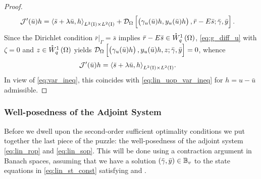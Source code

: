 \documentclass[final]{siamltex}
\begin{document}
\begin{proof}
\begin{align*}
	\mathcal{J}'({\bar{u}}) h	
    		&= {{\mathop{{\left\langle {{{\bar{s}} + \lambda {\bar{u}}, h}} \right\rangle}}}_{{{L^2\del{{{\text{\rm I}}}}}}\times{{L^2\del{{{\text{\rm I}}}}}}}}
			+ {{\mathcal{D}}_\Omega}\sbr{\del{\gamma_u({\bar{u}})h, y_u({\bar{u}})h},{\bar{r}} - E {\bar{s}};{\bar{\gamma}}, {\bar{y}}}.
\end{align*}
Since the Dirichlet 
condition ${\bar{r}}{\vert}_\Gamma = {\bar{s}}$ implies ${\bar{r}} - E {\bar{s}} \in {{\mathring{W}^{{1}}_{{q}}\del{{\Omega}}}}$,
\eqref{eq:g_diff_u}  with $\zeta = 0$ and $z \in {{\mathring{W}^{1}_{q}\del{\Omega}}}$ yields 
${{\mathcal{D}}_\Omega}\sbr{\del{\gamma_u({\bar{u}})h}, y_u({\bar{u}})h, z; {\bar{\gamma}}, {\bar{y}}} = 0$, whence
\begin{align*}	
     \mathcal{J}'({\bar{u}}) h				 
        		&= {{\mathop{{\left\langle {{{\bar{s}} + \lambda {\bar{u}}, h}} \right\rangle}}}_{{{L^2\del{{{\text{\rm I}}}}}}\times{{L^2\del{{{\text{\rm I}}}}}}}}.
\end{align*}
In view of \eqref{eq:var_ineq}, this coincides with \eqref{eq:lin_uop_var_ineq} for $h = u - {\bar{u}}$ admissible. 
\end{proof}

\subsubsection{Well-posedness of the Adjoint System}
\label{s:oc_rc_adjoint}
Before we dwell upon the second-order sufficient optimality conditions we put together the last 
piece of the puzzle: the well-posedness of the adjoint system 
\eqref{eq:lin_rop} and \eqref{eq:lin_sop}. This will be done using a contraction argument in 
Banach spaces, assuming that we have a solution $\del{{\bar{\gamma}},{\bar{y}}} \in {\mathbb{B}}_v$ 
to the state equations in \eqref{eq:lin_st_const} satisfying  and .
\end{document}
